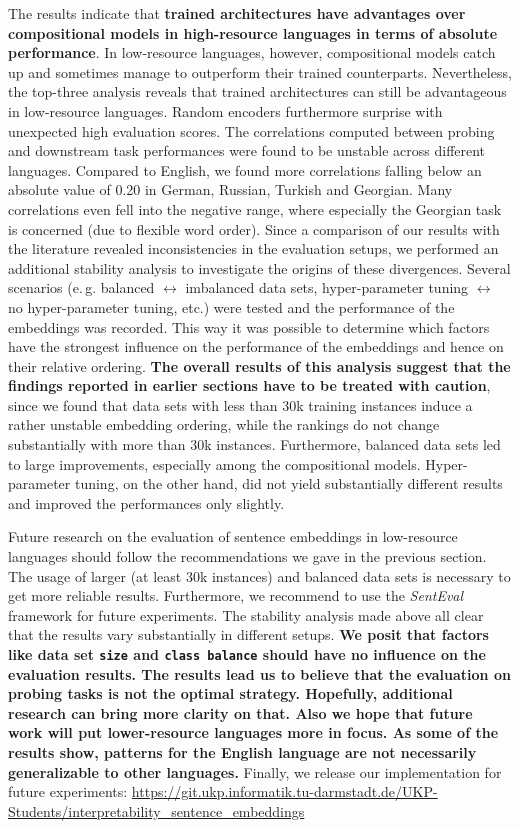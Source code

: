  The results indicate that \textbf{trained architectures have advantages over compositional models in high-resource languages in terms of absolute performance}. In low-resource languages, however, compositional models catch up and sometimes manage to outperform their trained counterparts. Nevertheless, the top-three analysis reveals that trained architectures can still be advantageous in low-resource languages. Random encoders furthermore surprise with unexpected high evaluation scores. The correlations computed between probing and downstream task performances were found to be unstable across different languages. Compared to English, we found more correlations falling below an absolute value of 0.20 in German, Russian, Turkish and Georgian. Many correlations even fell into the negative range, where especially the Georgian  task is concerned (due to flexible word order). Since a comparison of our results with the literature revealed inconsistencies in the evaluation setups, we performed an additional stability analysis to investigate the origins of these divergences. Several scenarios (e.\,g. balanced $\leftrightarrow$ imbalanced data sets, hyper-parameter tuning $\leftrightarrow$ no hyper-parameter tuning, etc.) were tested and the performance of the embeddings was recorded. This way it was possible to determine which factors have the strongest influence on the performance of the embeddings and hence on their relative ordering. \textbf{The overall results of this analysis suggest that the findings reported in earlier sections have to be treated with caution}, since we found that data sets with less than 30k training instances induce a rather unstable embedding ordering, while the rankings do not change substantially with more than 30k instances. Furthermore, balanced data sets led to large improvements, especially among the compositional models. Hyper-parameter tuning, on the other hand, did not yield substantially different results and improved the performances only slightly.

 Future research on the evaluation of sentence embeddings in low-resource languages should follow the recommendations we gave in the previous section. The usage of larger (at least 30k instances) and balanced data sets is necessary to get more reliable results. Furthermore, we recommend to use the \textit{SentEval} framework for future experiments. The stability analysis made above all clear that the results vary substantially in different setups. \textbf{We posit that factors like data set \texttt{size} and \texttt{class balance} should have no influence on the evaluation results. The results lead us to believe that the evaluation on probing tasks is not the optimal strategy. Hopefully, additional research can bring more clarity on that. Also we hope that future work will put lower-resource languages more in focus. As some of the results show, patterns for the English language are not necessarily generalizable to other languages.} Finally, we release our implementation for future experiments: \url{https://git.ukp.informatik.tu-darmstadt.de/UKP-Students/interpretability_sentence_embeddings}